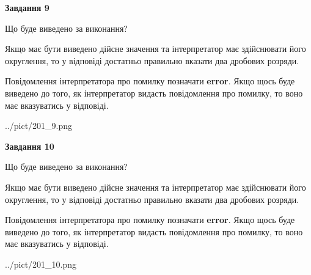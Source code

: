 \documentclass[12pt, ukrainian]{article}
\begin{document}
{\begin {Large}
{\begin {center}\textbf{Завдання 9}\end {center}}\par
Що буде виведено за виконання? \par

Якщо має бути виведено дійсне значення та інтерпретатор має здійснювати його округлення, 
то у відповіді достатньо правильно вказати два дробових розряди.

Повідомлення інтерпретатора про помилку позначати \textbf{error}.
Якщо щось буде виведено до того, як інтерпретатор видасть повідомлення про помилку, 
то воно має вказуватись у відповіді. \par

\begin{center}
	{../pict/201_9.png}
\end{center}
\newpage

{\begin {center}\textbf{Завдання 10}\end {center}}\par
Що буде виведено за виконання? \par

Якщо має бути виведено дійсне значення та інтерпретатор має здійснювати його округлення, 
то у відповіді достатньо правильно вказати два дробових розряди.

Повідомлення інтерпретатора про помилку позначати \textbf{error}.
Якщо щось буде виведено до того, як інтерпретатор видасть повідомлення про помилку, 
то воно має вказуватись у відповіді. \par

\begin{center}
	{../pict/201_10.png}
\end{center}
\newpage

\end {Large}}
\end{document}
